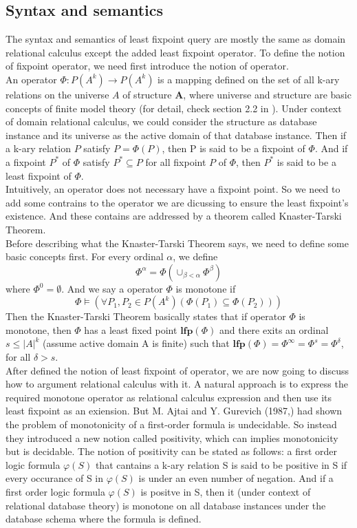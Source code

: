 \subsection{Syntax and semantics}
The syntax and semantics of least fixpoint query are mostly the same as domain relational calculus except the added least fixpoint operator. To define the notion of fixpoint operator, we need first introduce the notion of operator. \\
An operator $\Phi: \textit{P}(A^k)\rightarrow \textit{P}(A^k)$ is a mapping defined on the set of all k-ary relations on the universe $A$ of structure $\textbf{A}$, where universe and structure are basic concepts of finite model theory (for detail, check section 2.2 in \cite{kolaitis1}). Under context of domain relational calculus, we could consider the structure as database instance and its universe as the active domain of that database instance. Then if a k-ary relation $P$ satisfy $P=\Phi(P)$, then P is said to be a fixpoint of $\Phi$. And if a fixpoint $P^*$ of $\Phi$ satisfy $P^*\subseteq P$ for all fixpoint $P$ of $\Phi$, then $P^*$ is said to be a least fixpoint of $\Phi$.\\
Intuitively, an operator does not necessary have a fixpoint point. So we need to add some contrains to the operator we are dicussing to ensure the least fixpoint's existence. And these contains are addressed by a theorem called Knaster-Tarski Theorem\cite{Tarski}. \\
Before describing what the Knaster-Tarski Theorem says, we need to define some basic concepts first. For every ordinal $\alpha$, we define 
$$\Phi^{\alpha}=\Phi(\cup_{\beta<\alpha} \Phi^{\beta})$$
where $\Phi^0=\emptyset$. And we say a operator $\Phi$ is monotone if 
$$\Phi\models(\forall P_1,P_2\in P(A^k)(\Phi(P_1)\subseteq\Phi(P_2)))$$
Then the Knaster-Tarski Theorem basically states that if operator $\Phi$ is monotone, then $\Phi$ has a least fixed point $\textbf{lfp}(\Phi)$ and there exits an ordinal $s\leq |A|^k$ (assume active domain A is finite) such that $\textbf{lfp}(\Phi)=\Phi^{\infty}=\Phi^s=\Phi^{\delta}$, for all $\delta > s$.\\
After defined the notion of least fixpoint of operator, we are now going to discuss how to argument relational calculus with it. A natural approach is to express the required monotone operator as relational calculus expression and then use its least fixpoint as an exiension. But M. Ajtai and Y. Gurevich (1987,\cite{Ajtai}) had shown the problem of monotonicity of a first-order formula is undecidable. So instead they introduced a new notion called positivity, which can implies monotonicity but is decidable. The notion of positivity can be stated as follows: a first order logic formula $\varphi(S)$ that cantains a k-ary relation S is said to be positive in S if every occurance of S in $\varphi(S)$ is under an even number of negation. And if a first order logic formula $\varphi(S)$ is positve in S, then it (under context of relational database theory) is monotone on all database instances under the database schema where the formula is defined.\\ 
